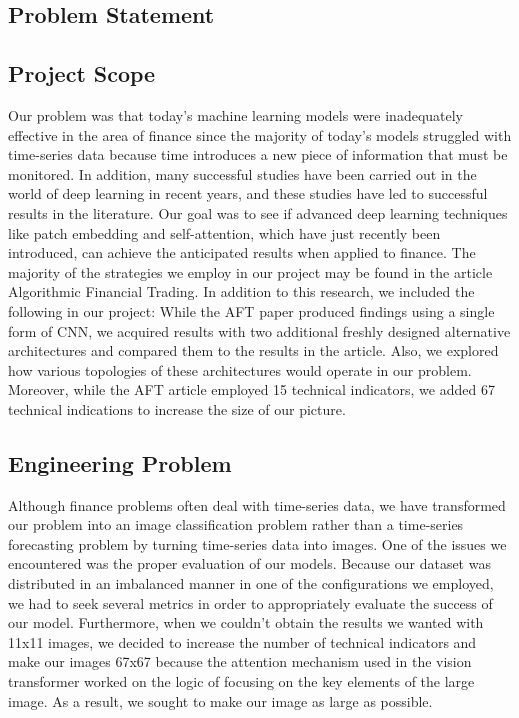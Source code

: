 \documentclass{article}
\begin{document}
\begin{center}
    \item\section{Problem Statement}
\end{center}
\subsection{Project Scope}
Our problem was that today's machine learning models were inadequately effective in the area of finance since the majority of today's models struggled with time-series data because time introduces a new piece of information that must be monitored. In addition, many successful studies have been carried out in the world of deep learning in recent years, and these studies have led to successful results in the literature. Our goal was to see if advanced deep learning techniques like patch embedding and self-attention, which have just recently been introduced, can achieve the anticipated results when applied to finance.
The majority of the strategies we employ in our project may be found in the article Algorithmic Financial Trading. In addition to this research, we included the following in our project: While the AFT paper produced findings using a single form of CNN, we acquired results with two additional freshly designed alternative architectures and compared them to the results in the article. Also, we explored how various topologies of these architectures would operate in our problem. Moreover, while the AFT article employed 15 technical indicators, we added 67 technical indications to increase the size of our picture.

\subsection{Engineering Problem}
Although finance problems often deal with time-series data, we have transformed our problem into an image classification problem rather than a time-series forecasting problem by turning time-series data into images. One of the issues we encountered was the proper evaluation of our models. Because our dataset was distributed in an imbalanced manner in one of the configurations we employed, we had to seek several metrics in order to appropriately evaluate the success of our model. Furthermore, when we couldn't obtain the results we wanted with 11x11 images, we decided to increase the number of technical indicators and make our images 67x67 because the attention mechanism used in the vision transformer worked on the logic of focusing on the key elements of the large image. As a result, we sought to make our image as large as possible.
\end{document}
